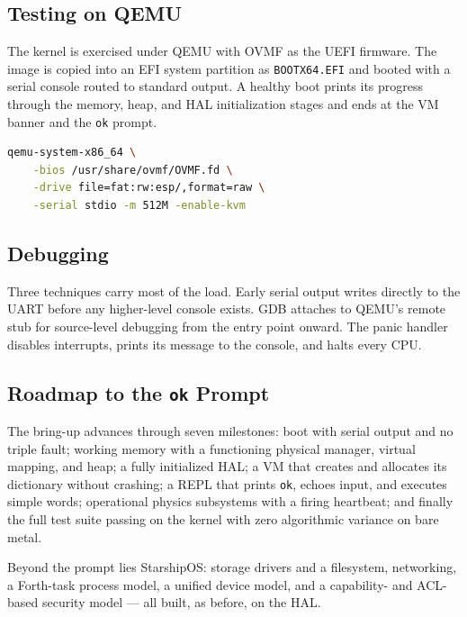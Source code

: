 \subsection{Testing on QEMU}

The kernel is exercised under QEMU with OVMF as the UEFI firmware. The image is
copied into an EFI system partition as \texttt{BOOTX64.EFI} and booted with a
serial console routed to standard output. A healthy boot prints its progress
through the memory, heap, and HAL initialization stages and ends at the VM banner
and the \texttt{ok} prompt.

\begin{lstlisting}[language=bash]
qemu-system-x86_64 \
    -bios /usr/share/ovmf/OVMF.fd \
    -drive file=fat:rw:esp/,format=raw \
    -serial stdio -m 512M -enable-kvm
\end{lstlisting}

\subsection{Debugging}

Three techniques carry most of the load. Early serial output writes directly to
the UART before any higher-level console exists. GDB attaches to QEMU's remote
stub for source-level debugging from the entry point onward. The panic handler
disables interrupts, prints its message to the console, and halts every CPU.

\subsection{Roadmap to the \texttt{ok} Prompt}

The bring-up advances through seven milestones: boot with serial output and no
triple fault; working memory with a functioning physical manager, virtual
mapping, and heap; a fully initialized HAL; a VM that creates and allocates its
dictionary without crashing; a REPL that prints \texttt{ok}, echoes input, and
executes simple words; operational physics subsystems with a firing heartbeat;
and finally the full test suite passing on the kernel with zero algorithmic
variance on bare metal.


Beyond the prompt lies StarshipOS: storage drivers and a filesystem, networking,
a Forth-task process model, a unified device model, and a capability- and
ACL-based security model --- all built, as before, on the HAL.
